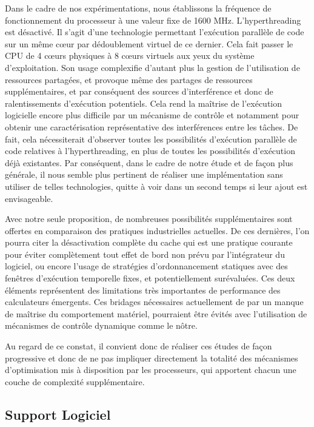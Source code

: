 \documentclass[french, a4paper, 11pt, twoside, pdftex]{StyleThese}
\begin{document}
		Dans le cadre de nos expérimentations, nous établissons la fréquence de fonctionnement du processeur à une valeur fixe de 1600 MHz. L'hyperthreading est désactivé. Il s'agit d'une technologie permettant l'exécution parallèle de code sur un même cœur par dédoublement virtuel de ce dernier. Cela fait passer  le CPU de 4 cœurs physiques à 8 cœurs virtuels aux yeux du système d'exploitation. Son usage complexifie d'autant plus la gestion de l'utilisation de ressources partagées, et provoque même des partages de ressources supplémentaires, et par conséquent des sources d'interférence et donc de ralentissements d'exécution potentiels. Cela rend la maîtrise de l'exécution logicielle encore plus difficile par un mécanisme de contrôle et notamment pour obtenir une caractérisation représentative des interférences entre les tâches. De fait, cela nécessiterait d'observer toutes les possibilités d'exécution parallèle de code relatives à l'hyperthreading, en plus de toutes les possibilités d'exécution déjà existantes. Par conséquent, dans le cadre de notre étude et de façon plus générale, il nous semble plus pertinent de réaliser une implémentation sans utiliser de telles technologies, quitte à voir dans un second temps si leur ajout est envisageable.
		
		Avec notre seule proposition, de nombreuses possibilités supplémentaires sont offertes en comparaison des pratiques industrielles actuelles. De ces dernières, l'on pourra citer la désactivation complète du cache qui est une pratique courante pour éviter complètement tout effet de bord non prévu par l'intégrateur du logiciel, ou encore l'usage de stratégies d'ordonnancement statiques avec des fenêtres d'exécution temporelle fixes, et potentiellement surévaluées. Ces deux éléments représentent des limitations très importantes de performance des calculateurs émergents. Ces bridages nécessaires actuellement de par un manque de maîtrise du comportement matériel, pourraient être évités avec l'utilisation de mécanismes de contrôle dynamique comme le nôtre. 
		
		Au regard de ce constat, il convient donc de réaliser ces études de façon progressive et donc de ne pas impliquer directement la totalité des mécanismes d'optimisation mis à disposition par les processeurs, qui apportent chacun une couche de complexité supplémentaire.
		
		\pagebreak
        \subsection{Support Logiciel}
        
\end{document}
